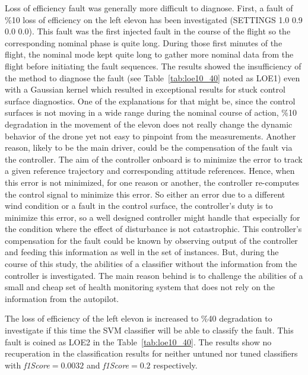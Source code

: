 Loss of efficiency fault was generally more difficult to diagnose. 
First, a fault of \%10 loss of efficiency on the left elevon has been investigated (SETTINGS 1.0 0.9 0.0 0.0). 
This fault was the first injected fault in the course of the flight so the corresponding nominal phase is quite long. 
During those first minutes of the flight, the nominal mode kept quite long to gather more nominal data from the flight before initiating the fault sequences. 
The results showed the insufficiency of the method to diagnose the fault (see Table~\ref{tab:loe10_40} noted as LOE1) even with a Gaussian kernel which resulted in exceptional results for stuck control surface diagnostics. 
One of the explanations for that might be, since the control surfaces is not moving in a wide range during the nominal course of action, \%10 degradation in the movement of the elevon does not really change the dynamic behavior of the drone yet not easy to pinpoint from the measurements.
Another reason, likely to be the main driver, could be the compensation of the fault via the controller.
The aim of the controller onboard is to minimize the error to track a given reference trajectory and corresponding attitude references. 
Hence, when this error is not minimized, for one reason or another, the controller re-computes the control signal to minimize this error. 
So either an error due to a different wind condition or a fault in the control surface, the controller's duty is to minimize this error, so a well designed controller might handle that especially for the condition where the effect of disturbance is not catastrophic. 
This controller's compensation for the fault could be known by observing output of the controller and feeding this information as well in the set of instances. 
But, during the course of this study, the abilities of a classifier without the information from the controller is investigated. 
The main reason behind is to challenge the abilities of a small and cheap set of health monitoring system that does not rely on the information from the autopilot. 

The loss of efficiency of the left elevon is increased to \%40 degradation to investigate if this time the SVM classifier will be able to classify the fault. This fault is coined as LOE2 in the Table~\ref{tab:loe10_40}. The results show no recuperation in the classification results for neither untuned nor tuned classifiers with \emph{f1Score}$=0.0032$ and \emph{f1Score}$=0.2$ respectively.


